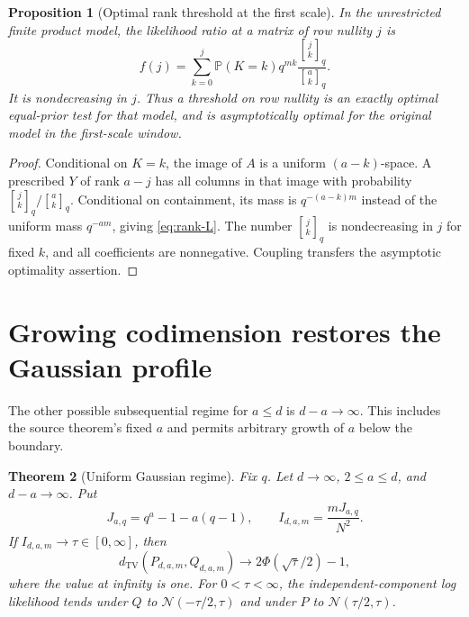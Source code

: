 \documentclass[11pt]{article}
\newtheorem{theorem}{Theorem}[section]
\newtheorem{proposition}[theorem]{Proposition}
\theoremstyle{remark}\newtheorem{remark}[theorem]{Remark}
\newcommand{\Pp}{\mathbb P}
\newcommand{\TV}{d_{\mathrm{TV}}}
\newcommand{\qb}[2]{\genfrac{[}{]}{0pt}{}{#1}{#2}_q}
\begin{document}
\begin{proposition}[Optimal rank threshold at the first scale]\label{prop:rank-threshold}
In the unrestricted finite product model, the likelihood ratio at a matrix of row nullity $j$ is
\begin{equation}\label{eq:rank-L}
 f(j)=\sum_{k=0}^j\Pp(K=k)q^{mk}\frac{\qb jk}{\qb ak}.
\end{equation}
It is nondecreasing in $j$. Thus a threshold on row nullity is an exactly optimal equal-prior test for that model, and is asymptotically optimal for the original model in the first-scale window.
\end{proposition}

\begin{proof}
Conditional on $K=k$, the image of $A$ is a uniform $(a-k)$-space. A prescribed $Y$ of rank $a-j$ has all columns in that image with probability $\qb jk/\qb ak$. Conditional on containment, its mass is $q^{-(a-k)m}$ instead of the uniform mass $q^{-am}$, giving \eqref{eq:rank-L}. The number $\qb jk$ is nondecreasing in $j$ for fixed $k$, and all coefficients are nonnegative. Coupling transfers the asymptotic optimality assertion.
\end{proof}

\section{Growing codimension restores the Gaussian profile}
The other possible subsequential regime for $a\le d$ is $d-a\to\infty$. This includes the source theorem's fixed $a$ and permits arbitrary growth of $a$ below the boundary.

\begin{theorem}[Uniform Gaussian regime]\label{thm:gaussian}
Fix $q$. Let $d\to\infty$, $2\le a\le d$, and $d-a\to\infty$. Put
\[
 J_{a,q}=q^a-1-a(q-1),\qquad I_{d,a,m}=\frac{mJ_{a,q}}{N^2}.
\]
If $I_{d,a,m}\to\tau\in[0,\infty]$, then
\[
 \TV(P_{d,a,m},Q_{d,a,m})\longrightarrow
 2\Phi(\sqrt\tau/2)-1,
\]
where the value at infinity is one. For $0<\tau<\infty$, the independent-component log likelihood tends under $Q$ to $\mathcal N(-\tau/2,\tau)$ and under $P$ to $\mathcal N(\tau/2,\tau)$.
\end{theorem}
\end{document}
